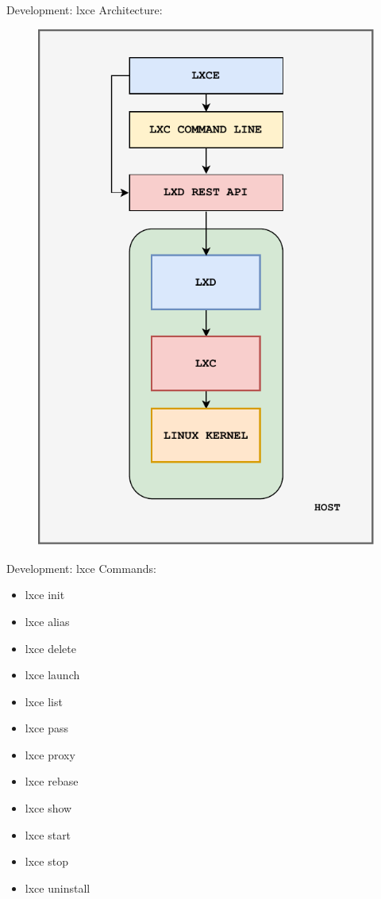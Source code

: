 \documentclass[10pt,english,handout,aspectradio=169]{beamer}
\begin{document}
\begin{frame}{Development: lxce}
Architecture:
\begin{figure}
    \centering
    \includegraphics[scale=0.5]{img/lxce-diagram} 
\end{figure}
\end{frame}
\begin{frame}{Development: lxce}
Commands:
\begin{itemize}
    \item lxce init
    \item lxce alias
    \item lxce delete
    \item lxce launch
    \item lxce list
    \item lxce pass
    \item lxce proxy
    \item lxce rebase
    \item lxce show
    \item lxce start
    \item lxce stop
    \item lxce uninstall
\end{itemize}
\end{frame}
\end{document}
